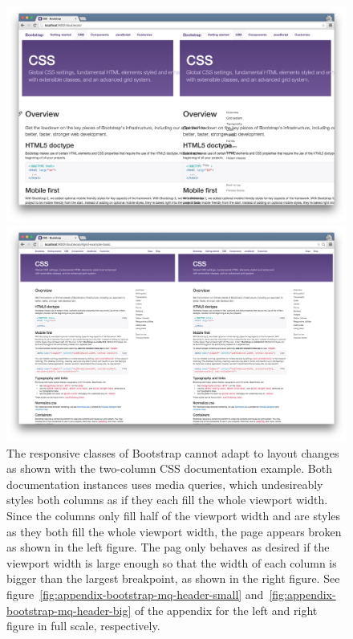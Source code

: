 \documentclass[a4paper,11pt]{kth-mag}
\begin{document}
      \begin{figure}[htbp]
        \centering
        \begin{minipage}{.5\textwidth}
          \centering
          \includegraphics[width=\linewidth]{images/bootstrap-mq-header-small}
        \end{minipage}%
        \begin{minipage}{.5\textwidth}
          \centering
          \includegraphics[width=\linewidth]{images/bootstrap-mq-header-big}
        \end{minipage}
        \caption{
          The \gls{responsive} classes of \gls{Bootstrap} cannot adapt to layout changes as shown with the two-column \gls{CSS} documentation example.
          Both documentation instances uses \gls{media queries}, which undesireably styles both columns as if they each fill the whole \gls{viewport} width.
          Since the columns only fill half of the \gls{viewport} width and are styles as they both fill the whole \gls{viewport} width, the page appears broken as shown in the left figure.
          The pag only behaves as desired if the \gls{viewport} width is large enough so that the width of each column is bigger than the largest  breakpoint, as shown in the right figure.
          See figure~\ref{fig:appendix-bootstrap-mq-header-small} and~\ref{fig:appendix-bootstrap-mq-header-big} of the appendix for the left and right figure in full scale, respectively.}
        \label{fig:eval-bootstrap-mq-broken}
      \end{figure}
\end{document}
